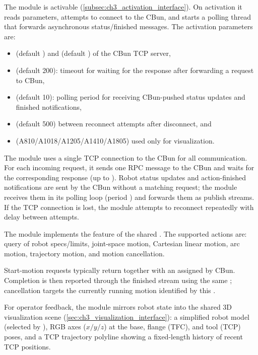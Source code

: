 The module is activable (\autoref{subsec:ch3_activation_interface}). On activation it reads parameters, attempts to connect to the CBun, and starts a polling thread that forwards asynchronous status/finished messages.
The activation parameters are:
\begin{itemize}[nosep]
    \item {} (default ) and  (default ) of the CBun TCP server,
    \item {} (default 200): timeout for waiting for the response after forwarding a request to CBun,
    \item {} (default 10): polling period for receiving CBun-pushed status updates and finished notifications,
    \item {} (default 500) between reconnect attempts after disconnect, and
    \item {} (A810/A1018/A1205/A1410/A1805) used only for visualization.
\end{itemize}

The module uses a single TCP connection to the CBun for all communication.
For each incoming  request, it sends one RPC message to the CBun and waits for the corresponding response (up to ).
Robot status updates and action-finished notifications are sent by the CBun without a matching request; the module receives them in its polling loop (period ) and forwards them as publish streams.
If the TCP connection is lost, the module attempts to reconnect repeatedly with delay  between attempts.

The module implements the  feature of the shared .
The supported actions are: query of robot specs/limits, joint-space motion, Cartesian linear motion, arc motion, trajectory motion, and motion cancellation.

Start-motion requests typically return  together with an  assigned by CBun.
Completion is then reported through the finished stream using the same ; cancellation targets the currently running motion identified by this .

For operator feedback, the module mirrors robot state into the shared 3D visualization scene (\autoref{sec:ch3_visualization_interface}): a simplified robot model (selected by ), RGB axes ($x/y/z$) at the base, flange (TFC), and tool (TCP) poses, and a TCP trajectory polyline showing a fixed-length history of recent TCP positions.

